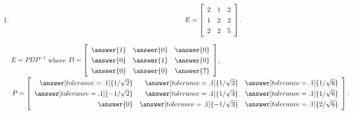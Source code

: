\documentclass{ximera}
\begin{document}
\begin{problem}
\begin{enumerate}
    
    \item $$E = \startmat{rrr}
      2 & 1 & 2 \\
      1 & 2 & 2 \\
      2 & 2 & 5 \\
    \stopmat.$$

    $E=PDP^{-1}$ where
      $D=\startmat{rrr}
        \answer{1} & \answer{0} & \answer{0} \\
        \answer{0} & \answer{1} & \answer{0} \\
        \answer{0} & \answer{0} & \answer{7} \\
      \stopmat$,
      $\def\arraystretch{1.3}
      P=\startmat{rrr}
        \answer[tolerance=.1]{1/\sqrt{2}} & \answer[tolerance=.1]{1/\sqrt{3}} & \answer[tolerance=.1]{1/\sqrt{6}} \\
        \answer[tolerance=.1]{-1/\sqrt{2}} & \answer[tolerance=.1]{1/\sqrt{3}} & \answer[tolerance=.1]{1/\sqrt{6}} \\
        \answer{0} & \answer[tolerance=.1]{-1/\sqrt{3}} & \answer[tolerance=.1]{2/\sqrt{6}} \\
      \stopmat$.
  \end{enumerate}




\end{problem}
\end{document}
